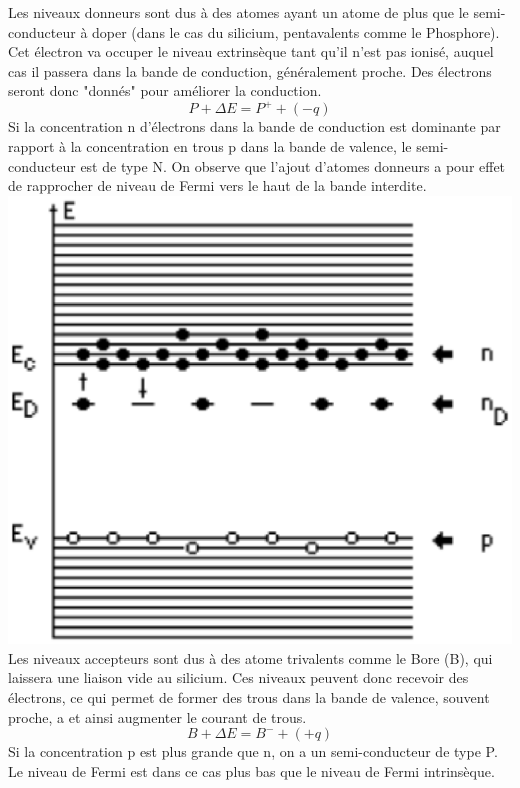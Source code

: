 Les niveaux donneurs sont dus à des atomes ayant un atome de plus que le semi-conducteur à doper (dans le cas du silicium, pentavalents comme le Phosphore). Cet électron va occuper le niveau extrinsèque tant qu'il n'est pas ionisé, auquel cas il passera dans la bande de conduction, généralement proche. Des électrons seront donc "donnés" pour améliorer la conduction.
\begin{equation}
P+\Delta E=P^+ + (-q)
\end{equation} 
Si la concentration n d'électrons dans la bande de conduction est dominante par rapport à la concentration en trous p dans la bande de valence, le semi-conducteur est de type N. On observe que l'ajout d'atomes donneurs a pour effet de rapprocher de niveau de Fermi vers le haut de la bande interdite.
\\ \includegraphics[scale=0.3]{doner.eps} \\
Les niveaux accepteurs sont dus à des atome trivalents comme le Bore (B), qui laissera une liaison vide au silicium. Ces niveaux peuvent donc recevoir des électrons, ce qui permet de former des trous dans la bande de valence, souvent proche, a et ainsi augmenter le courant de trous.
\begin{equation}
B+\Delta E=B^- + (+q)
\end{equation} 
Si la concentration p est plus grande que n, on a un semi-conducteur de type P. Le niveau de Fermi est dans ce cas plus bas que le niveau de Fermi intrinsèque.
